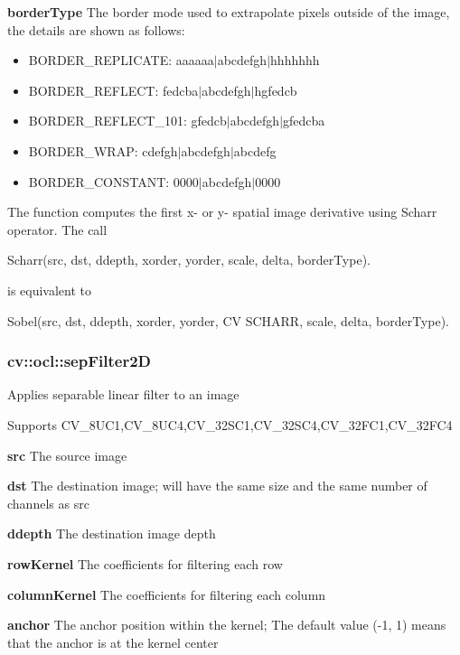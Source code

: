 \documentclass{article}
\begin{document}
\textbf{borderType }The border mode used to extrapolate pixels outside of
the image, the details are shown as follows:

\begin{itemize}
\item BORDER{\_}REPLICATE: aaaaaa$\vert $abcdefgh$\vert $hhhhhhh
\item BORDER{\_}REFLECT: fedcba$\vert $abcdefgh$\vert $hgfedcb
\item BORDER{\_}REFLECT{\_}101: gfedcb$\vert $abcdefgh$\vert $gfedcba
\item BORDER{\_}WRAP: cdefgh$\vert $abcdefgh$\vert $abcdefg
\item BORDER{\_}CONSTANT: 0000$\vert $abcdefgh$\vert $0000
\end{itemize}

The function computes the first x- or y- spatial image derivative using
Scharr operator. The call

\begin{center}
Scharr(src, dst, ddepth, xorder, yorder, scale, delta, borderType).
\end{center}

is equivalent to

\begin{center}
Sobel(src, dst, ddepth, xorder, yorder, CV SCHARR, scale, delta,
borderType).
\end{center}

\newpage

\subsubsection{cv::ocl::sepFilter2D}
\label{subsubsec:mylabel43}
Applies separable linear filter to an image

Supports CV{\_}8UC1,CV{\_}8UC4,CV{\_}32SC1,CV{\_}32SC4,CV{\_}32FC1,CV{\_}32FC4

\textbf{src }The source image

\textbf{dst }The destination image; will have the same size and the same
number of channels as src

\textbf{ddepth }The destination image depth

\textbf{rowKernel }The coefficients for filtering each row

\textbf{columnKernel }The coefficients for filtering each column

\textbf{anchor }The anchor position within the kernel; The default value
(-1, 1) means that the anchor is at the kernel center
\end{document}
